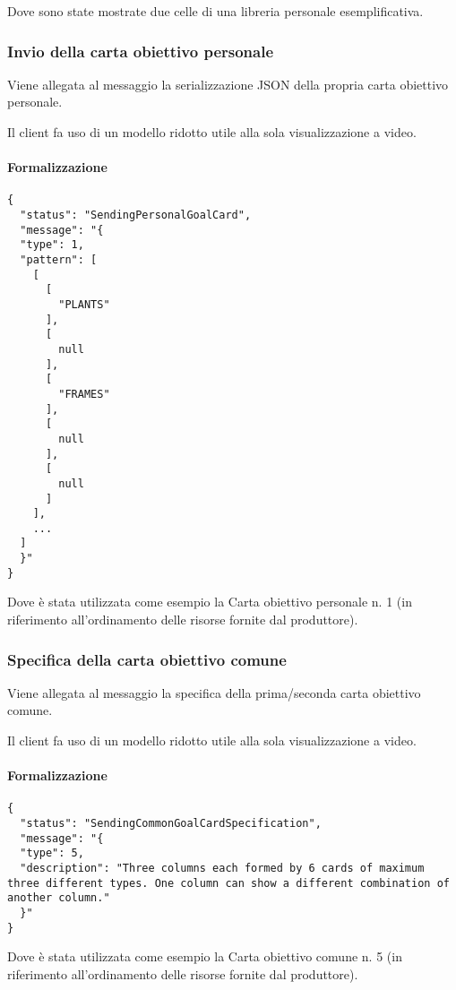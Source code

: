 \documentclass[a4paper,11pt]{article} %
\begin{document}
    Dove sono state mostrate due celle di una libreria personale esemplificativa.

    \subsubsection{Invio della carta obiettivo personale}
    Viene allegata al messaggio la serializzazione JSON della propria carta obiettivo personale.

    Il client fa uso di un modello ridotto utile alla sola visualizzazione a video.

    \paragraph{Formalizzazione}
    \begin{verbatim}
{
  "status": "SendingPersonalGoalCard",
  "message": "{
  "type": 1,
  "pattern": [
    [
      [
        "PLANTS"
      ],
      [
        null
      ],
      [
        "FRAMES"
      ],
      [
        null
      ],
      [
        null
      ]
    ],
    ...
  ]
  }"
}
    \end{verbatim}

    Dove è stata utilizzata come esempio la Carta obiettivo personale n. 1 (in riferimento all'ordinamento delle risorse fornite dal produttore).

    \subsubsection{Specifica della carta obiettivo comune}
    Viene allegata al messaggio la specifica della prima/seconda carta obiettivo comune.

    Il client fa uso di un modello ridotto utile alla sola visualizzazione a video.

    \paragraph{Formalizzazione}
    \begin{verbatim}
{
  "status": "SendingCommonGoalCardSpecification",
  "message": "{
  "type": 5,
  "description": "Three columns each formed by 6 cards of maximum three different types. One column can show a different combination of another column."
  }"
}
    \end{verbatim}

    Dove è stata utilizzata come esempio la Carta obiettivo comune n. 5 (in riferimento all'ordinamento delle risorse fornite dal produttore).
\end{document}
